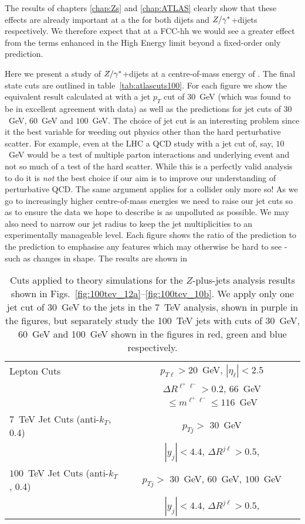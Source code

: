 	The results of chapters \ref{chap:Zs} and \ref{chap:ATLAS} clearly show that these effects are already important
	at a the \stev for both dijets and $Z/\gamma^*$+dijets respectively.  We therefore expect that at a \htev FCC-hh we would
	see a greater effect from the terms enhanced in the High Energy limit beyond a fixed-order only prediction.

	Here we present a study of $Z/\gamma^*$+dijets at a centre-of-mass energy of \htev.  The final state cuts
	are outlined in table~\eqref{tab:atlascuts100}.  For each figure we show the equivalent result calculated
	at \stev with a jet $p_T$ cut of $30$~GeV (which was found to be in excellent agreement with data) as
	well as the \htev predictions for jet cuts of $30$~GeV, $60$~GeV and $100$~GeV.  The choice of jet cut
	is an interesting problem since it the best variable for weeding out physics other than the hard
	perturbative scatter.  For example, even at the \stev LHC a QCD study with a jet cut of, say,
	$10$~GeV would be a test of multiple parton interactions and underlying event and not so much of a test
	of the hard scatter.  While this is a perfectly valid analysis to do it is \emph{not} the best choice if our aim is to
	improve our understanding of perturbative QCD.  The same argument applies for a \htev collider
	only more so!  As we go to increasingly higher centre-of-mass energies we need to raise our
	jet cuts so as to ensure the data we hope to describe is as unpolluted as possible.  We may also need to
	narrow our jet radius to keep the jet multiplicities to an experimentally manageable level.  Each figure
	shows the ratio of the \htev prediction to the \stev prediction to emphasise any features
	which may otherwise be hard to see - such as changes in shape.  The \stev results are shown in

	\begin{table}[bth]
	  \centering
	  \begin{tabular}{|l|c|}
	    \hline
	    Lepton Cuts & $p_{T\ell}>20$~GeV, \; $|\eta_\ell|<2.5$ \\
	    & $\Delta R^{\ell^+\ell^-} > 0.2$, \; $66$~GeV $\leq m^{\ell^+\ell^-} \leq
	      116$~GeV \\ \hline
	    $7$~TeV Jet Cuts (anti-$k_T$, 0.4) & $p_{Tj}>$ $30$~GeV \\
	    &  $|y_j|<4.4$, \;$\Delta R^{j\ell} >0.5$,  \\ \hline
	    $100$~TeV Jet Cuts (anti-$k_T$, 0.4) & $p_{Tj}>$ $30$~GeV, $60$~GeV, $100$~GeV \\
	    &  $|y_j|<4.4$, \;$\Delta R^{j\ell} >0.5$,  \\ \hline
	  \end{tabular}
	  \caption{Cuts applied to theory simulations for the \htev
	    $Z$-plus-jets analysis results shown in Figs.~\eqref{fig:100tev_12a}--\eqref{fig:100tev_10b}.  We apply only one
	    jet cut of 30~GeV to the jets in the 7~TeV analysis, shown in purple in the figures, but separately study
	    the 100~TeV jets with cuts of 30~GeV, 60~GeV and 100~GeV shown in the figures in red, green and blue respectively.}
	  \label{tab:atlascuts100}
	\end{table}

